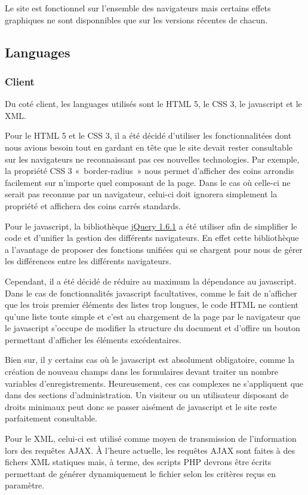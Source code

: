 \documentclass[letter, 11pt, draft]{report}
\begin{document}
Le site est fonctionnel sur l'ensemble des navigateurs mais certains effets graphiques ne sont disponnibles que sur les versions récentes de chacun.

\subsection{Languages}
\subsubsection{Client}
Du coté client, les languages utilisés sont le HTML 5, le CSS 3, le javascript et le XML.

Pour le HTML 5 et le CSS 3, il a été décidé d'utiliser les fonctionnalitées dont nous avions besoin tout en gardant en tête que le site devait rester consultable sur les navigateurs ne reconnaissant pas ces nouvelles technologies. Par exemple, la propriété CSS 3 «~border-radius~» nous permet d'afficher des coins arrondis facilement sur n'importe quel composant de la page. Dans le cas où celle-ci ne serait pas reconnue par un navigateur, celui-ci doit ignorera simplement la propriété et affichera des coins carrés standards.

Pour le javascript, la bibliothèque \href{http://jquery.com/}{jQuery 1.6.1} a été utiliser afin de simplifier le code et d'unifier la gestion des différents navigateurs. En effet cette bibliothèque a l'avantage de proposer des fonctions unifiées qui se chargent pour nous de gérer les différences entre les différents navigateurs.

Cependant, il a été décidé de réduire au maximum la dépendance au javascript. Dans le cas de fonctionnalités javascript facultatives, comme le fait de n'afficher que les trois premier éléments des listes trop longues, le code HTML ne contient qu'une liste toute simple et c'est au chargement de la page par le navigateur que le javascript s'occupe de modifier la structure du document et d'offire un bouton permettant d'afficher les éléments excédentaires.

Bien sur, il y certains cas où le javascript est absolument obligatoire, comme la création de nouveau champs dans les formulaires devant traiter un nombre variables d'enregistrements. Heureusement, ces cas complexes ne s'appliquent que dans des sections d'administration. Un visiteur ou un utilisateur disposant de droits minimaux peut donc se passer aisément de javascript et le site reste parfaitement consultable.

Pour le XML, celui-ci est utilisé comme moyen de transmission de l'information lors des requêtes AJAX. À l'heure actuelle, les requêtes AJAX sont faites à des fichers XML statiques mais, à terme, des scripts PHP devrons être écrits permettant de générer dynamiquement le fichier selon les critères reçus en paramètre.
\end{document}
